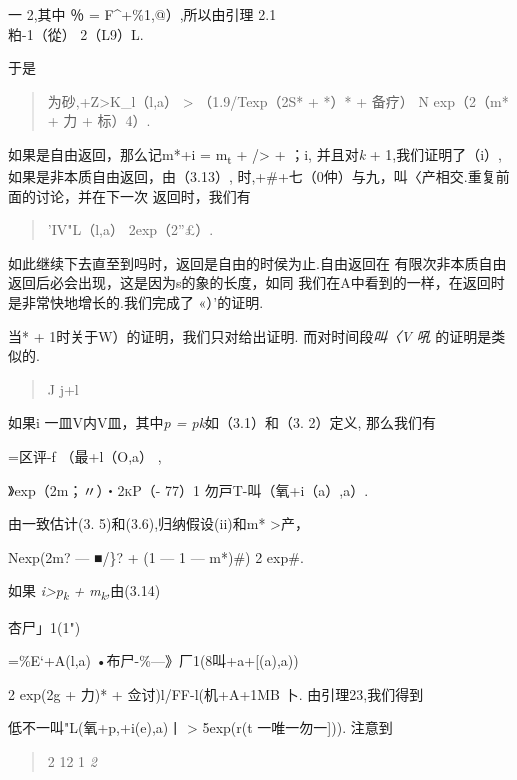 一 2,其中 ％ = F\^{}+\%1,@）,所以由引理 2.1\\
\textbar{}粕-1（從）\textbar{} 2（L9）L.

于是

\begin{quote}
\textbar{}为砂,+Z\textgreater{}K\_l（l,a）\textbar{} \textgreater{}
（1.9/Texp（2S* + *）* + 备疗） N exp（2（m* + 力 + 标）4）.
\end{quote}

如果是自由返回，那么记m*+i = m\textsubscript{t} + /\textgreater{} + ；i,
并且对\emph{k} + 1,我们证明了（i）,如果是非本质自由返回，由（3.13）,
时,+\#+七（0仲）与九，\textbar{}叫〈产相交.重复前面的讨论，并在下一次
返回时，我们有

\begin{quote}
'IV"L（l,a）\textbar{} 2exp（2''£）.
\end{quote}

如此继续下去直至到吗时，返回是自由的时侯为止.自由返回在
有限次非本质自由返回后必会出现，这是因为s的象的长度，如同
我们在A中看到的一样，在返回时是非常快地增长的.我们完成了 «）'的证明.

当* + 1时关于W）的证明，我们只对给出证明. 而对时间段\emph{叫〈V 吼}
的证明是类似的.

\begin{quote}
J j+l
\end{quote}

如果i 一皿V内V皿，其中\emph{p = pk}如（3.1）和（3. 2）定义, 那么我们有

=区评-f （最+l（O,a） ,

》exp（2m；〃）\textsc{・2kP（-} 77）1
勿戸T-叫（氧+i（a）,a）\textbar{}.

由一致估计(3. 5)和(3.6),归纳假设(ii)和m* \textgreater{}产，

Nexp(2m? --- ■/\}? + (1 --- 1 --- m*)\#) 2 exp\#.

如果 \emph{i\textgreater{}p\textsubscript{k} +
m\textsubscript{k},}由(3.14)

\textbar{}杏尸」1(1")\textbar{}

=\textbar{}\%E`+A(l,a) •布尸-\%---》厂1(8叫+a+{[}(a),a))\textbar{}

2 exp(2g + 力)* + 佥讨)l/FF-l(机+A+1MB 卜. 由引理23,我们得到

低不一叫"L(氧+p,+i(e),a)丨 \textgreater{} 5exp(r(t 一唯一勿一{]})).
注意到

\begin{quote}
2 12 1 \emph{2}
\end{quote}

